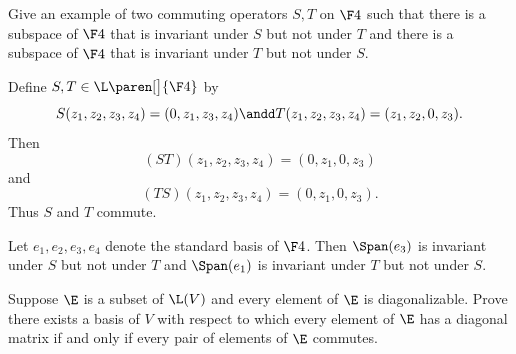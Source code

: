
\exercise
Give an example of two commuting operators $S, T$ on $\F4$ such that there is a subspace of $\F4$ that is invariant under $S$ but not under $T$ and there is a subspace of $\F4$ that is invariant under $T$ but not under $S$.

\begin{Solution}
Define $S, T \in \L\paren[\big]{\F4}$ by
\[
S(z_1, z_2, z_3, z_4) = (0, z_1, z_3, z_4) \andd T(z_1, z_2, z_3, z_4) = (z_1, z_2, 0, z_3).
\]
Then
\[
(ST)(z_1, z_2, z_3, z_4) = (0, z_1, 0, z_3)
\]
and
\[
(TS)(z_1, z_2, z_3, z_4) = (0, z_1, 0, z_3).
\]
Thus $S$ and $T$ commute.

Let $e_1, e_2, e_3, e_4$ denote the standard basis of $\F4$. Then $\Span(e_3)$ is invariant under $S$ but not under $T$ and $\Span(e_1)$ is invariant under $T$ but not under $S$.
\end{Solution}

\exercise
Suppose $\E$ is a subset of $\L(V)$ and every element of $\E$ is diagonalizable. Prove there exists a basis of $V$ with respect to which every element of $\E$ has a diagonal matrix if and only if every pair of elements of $\E$ commutes.%
 \label{3Diag}


